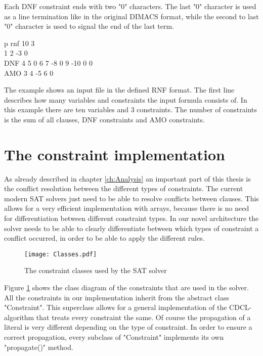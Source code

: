 Each DNF constraint ends with two "0" characters. The last "0" character is used as a line termination like in the original DIMACS format, while the second to last "0" character is used to signal the end of the last term.

\begin{leftbar}
p rnf 10 3 \\
1 2 -3 0 \\
DNF 4 5 0 6 7 -8 0 9 -10 0 0\\
AMO 3 4 -5 6 0
\end{leftbar}

The example shows an input file in the defined RNF format. The first line describes how many variables and constraints the input formula consists of. In this example there are ten variables and 3 constraints. The number of constraints is the sum of all clauses, DNF constraints and AMO constraints.

\section{The constraint implementation}

As already described in chapter \ref{ch:Analysis} an important part of this thesis is the conflict resolution between the different types of constraints. The current modern SAT solvers just need to be able to resolve conflicts between clauses. This allows for a very efficient implementation with arrays, because there is no need for differentiation between different constraint types. In our novel architecture the solver needs to be able to clearly differentiate between which types of constraint a conflict occurred, in order to be able to apply the different rules.

\begin{figure}[htbp]
  \centering
  \texttt{[image: Classes.pdf]}
  \caption{The constraint classes used by the SAT solver}
  \label{fig:constraints}
\end{figure}

Figure \ref{fig:constraints} shows the class diagram of the constraints that are used in the solver. All the constraints in our implementation inherit from the abstract class "Constraint". This superclass allows for a general implementation of the CDCL-algorithm that treats every constraint the same. Of course the propagation of a literal is very different depending on the type of constraint. In order to ensure a correct propagation, every subclass of "Constraint" implements its own "propagate()" method.

